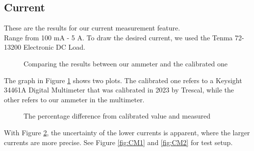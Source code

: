 \subsection{Current}
\label{sec:results_current}
These are the results for our current measurement feature. \\ Range from 100 mA - 5 A. To draw the desired current, we used the Tenma 72-13200 Electronic DC Load.

\begin{figure}[hbt!]
    \centering


    \caption{Comparing the results between our ammeter and the calibrated one}
    \label{fig:currGraph}
    
\end{figure}
\noindent The graph in Figure \ref{fig:currGraph} shows two plots. The calibrated one refers to a Keysight 34461A Digital Multimeter that was calibrated in 2023 by Trescal, while the other refers to our ammeter in the multimeter.

\begin{figure}[h]
    \centering


    \caption{The percentage difference from calibrated value and measured}
    \label{fig:currGraphDiff}
    
\end{figure}

\noindent With Figure \ref{fig:currGraphDiff}, the uncertainty of the lower currents is apparent, where the larger currents are more precise. See Figure \ref{fig:CM1} and \ref{fig:CM2} for test setup.
\FloatBarrier